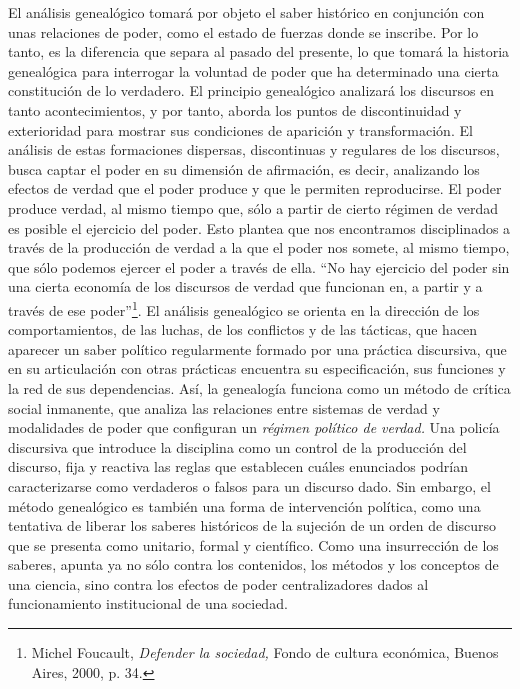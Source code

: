 El análisis genealógico tomará por objeto el saber histórico en conjunción con unas relaciones de poder, como el estado de fuerzas donde se inscribe. Por lo tanto, es la diferencia que separa al pasado del presente, lo que tomará la historia genealógica para interrogar la voluntad de poder que ha determinado una cierta constitución de lo verdadero. El principio genealógico analizará los discursos en tanto acontecimientos, y por tanto, aborda los puntos de discontinuidad y exterioridad para mostrar sus condiciones de aparición y transformación. El análisis de estas formaciones dispersas, discontinuas y regulares de los discursos, busca captar el poder en su dimensión de afirmación, es decir, analizando los efectos de verdad que el poder produce y que le permiten reproducirse. El poder produce verdad, al mismo tiempo que, sólo a partir de cierto régimen de verdad es posible el ejercicio del poder. Esto plantea que nos encontramos disciplinados a través de la producción de verdad a la que el poder nos somete, al mismo tiempo, que sólo podemos ejercer el poder a través de ella. \enquote{No hay ejercicio del poder sin una cierta economía de los discursos de verdad que funcionan en, a partir y a través de ese poder}\footnote{Michel Foucault, \emph{Defender la sociedad,} Fondo de cultura económica, Buenos Aires, 2000, p. 34.}. El análisis genealógico se orienta en la dirección de los comportamientos, de las luchas, de los conflictos y de las tácticas, que hacen aparecer un saber político regularmente formado por una práctica discursiva, que en su articulación con otras prácticas encuentra su especificación, sus funciones y la red de sus dependencias. Así, la genealogía funciona como un método de crítica social inmanente, que analiza las relaciones entre sistemas de verdad y modalidades de poder que configuran un \emph{régimen político de verdad.} Una policía discursiva que introduce la disciplina como un control de la producción del discurso, fija y reactiva las reglas que establecen cuáles enunciados podrían caracterizarse como verdaderos o falsos para un discurso dado. Sin embargo, el método genealógico es también una forma de intervención política, como una tentativa de liberar los saberes históricos de la sujeción de un orden de discurso que se presenta como unitario, formal y científico. Como una insurrección de los saberes, apunta ya no sólo contra los contenidos, los métodos y los conceptos de una ciencia, sino contra los efectos de poder centralizadores dados al funcionamiento institucional de una sociedad.

